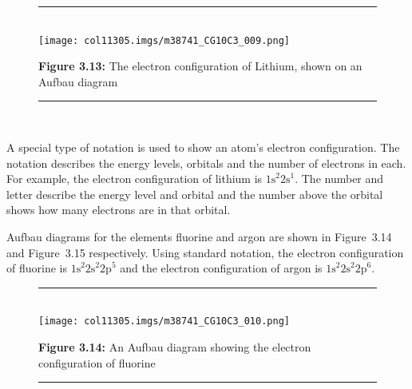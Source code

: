 	\begin{figure}[H] %
    \begin{center}
    \rule[.1in]{\figurerulewidth}{.005in} \\
        \label{m38741*uid101!!!underscore!!!media}\label{m38741*uid101!!!underscore!!!printimage}\texttt{[image: col11305.imgs/m38741\_CG10C3\_009.png]} %
      \vspace{2pt}
    \vspace{\rubberspace}\par \begin{cnxcaption}
	  \small \textbf{Figure 3.13: }The electron configuration of Lithium, shown on an Aufbau diagram
	\end{cnxcaption}
    \vspace{.1in}
    \rule[.1in]{\figurerulewidth}{.005in} \\
    \end{center}
 \end{figure}       
        \label{m38741*id259749}A special type of notation is used to show an atom's electron configuration. The notation describes the energy levels, orbitals and the number of electrons in each. For example, the electron configuration of lithium is ${1\mathrm{s}}^{2}{2\mathrm{s}}^{1}$. The number and letter describe the energy level and orbital and the number above the orbital shows how many electrons are in that orbital.\par 
        \label{m38741*id259782}Aufbau diagrams for the elements fluorine and argon are shown in Figure~3.14 and Figure~3.15 respectively. Using standard notation, the electron configuration of fluorine is ${1\mathrm{s}}^{2}{2\mathrm{s}}^{2}{2\mathrm{p}}^{5}$ and the electron configuration of argon is ${1\mathrm{s}}^{2}{2\mathrm{s}}^{2}{2\mathrm{p}}^{6}$.\par 
    \setcounter{subfigure}{0}
	\begin{figure}[H] %
    \begin{center}
    \rule[.1in]{\figurerulewidth}{.005in} \\
        \label{m38741*uid102!!!underscore!!!media}\label{m38741*uid102!!!underscore!!!printimage}\texttt{[image: col11305.imgs/m38741\_CG10C3\_010.png]} %
      \vspace{2pt}
    \vspace{\rubberspace}\par \begin{cnxcaption}
	  \small \textbf{Figure 3.14: }An Aufbau diagram showing the electron configuration of fluorine
	\end{cnxcaption}
    \vspace{.1in}
    \rule[.1in]{\figurerulewidth}{.005in} \\
    \end{center}
 \end{figure}       
